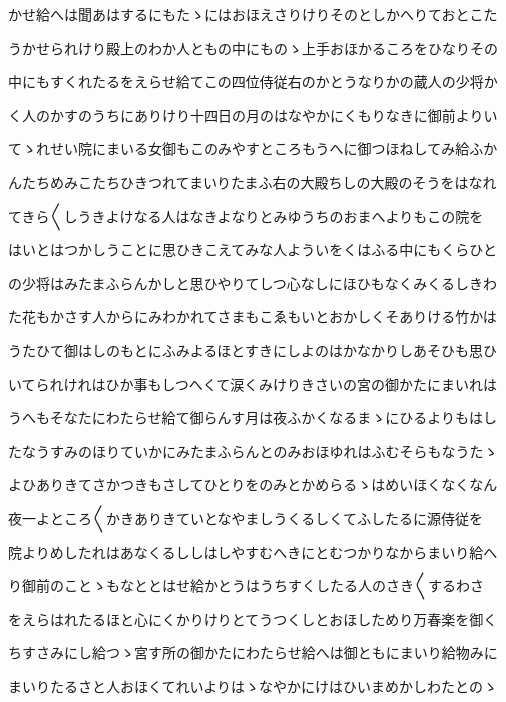 \documentclass[a4paper,11pt,landscape]{ltjtarticle}
\begin{document}
\par\medskip
かせ給へは聞あはするにもたゝにはおほえさりけりそのとしかへりておとこた
\par\medskip
うかせられけり殿上のわか人ともの中にものゝ上手おほかるころをひなりその
\par\medskip
中にもすくれたるをえらせ給てこの四位侍従右のかとうなりかの蔵人の少将か
\par\medskip
く人のかすのうちにありけり十四日の月のはなやかにくもりなきに御前よりい
\par\medskip
てゝれせい院にまいる女御もこのみやすところもうへに御つほねしてみ給ふか
\par\medskip
んたちめみこたちひきつれてまいりたまふ右の大殿ちしの大殿のそうをはなれ
\par\medskip
てきら〱しうきよけなる人はなきよなりとみゆうちのおまへよりもこの院を
\par\medskip
はいとはつかしうことに思ひきこえてみな人よういをくはふる中にもくらひと
\par\medskip
の少将はみたまふらんかしと思ひやりてしつ心なしにほひもなくみくるしきわ
\par\medskip
た花もかさす人からにみわかれてさまもこゑもいとおかしくそありける竹かは
\par\medskip
うたひて御はしのもとにふみよるほとすきにしよのはかなかりしあそひも思ひ
\par\medskip
いてられけれはひか事もしつへくて涙くみけりきさいの宮の御かたにまいれは
\par\medskip
うへもそなたにわたらせ給て御らんす月は夜ふかくなるまゝにひるよりもはし
\par\medskip
たなうすみのほりていかにみたまふらんとのみおほゆれはふむそらもなうたゝ
\par\medskip
よひありきてさかつきもさしてひとりをのみとかめらるゝはめいほくなくなん
\par\medskip
夜一よところ〱かきありきていとなやましうくるしくてふしたるに源侍従を
\par\medskip
院よりめしたれはあなくるししはしやすむへきにとむつかりなからまいり給へ
\par\medskip
り御前のことゝもなととはせ給かとうはうちすくしたる人のさき〱するわさ
\par\medskip
をえらはれたるほと心にくかりけりとてうつくしとおほしためり万春楽を御く
\par\medskip
ちすさみにし給つゝ宮す所の御かたにわたらせ給へは御ともにまいり給物みに
\par\medskip
まいりたるさと人おほくてれいよりはゝなやかにけはひいまめかしわたとのゝ
\par\medskip
\end{document}
